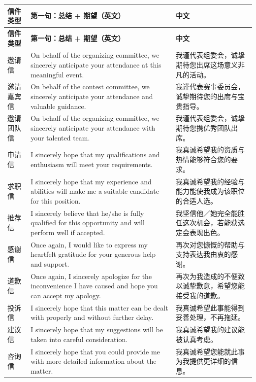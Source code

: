 \documentclass[11pt,a4paper]{ctexart}
\begin{document}
\begin{longtable}{L{2.2cm}L{9.0cm}L{4.7cm}}
\toprule
\textbf{信件类型} & \textbf{第一句：总结 + 期望（英文）} & \textbf{中文} \\
\midrule
\endfirsthead
\toprule
\textbf{信件类型} & \textbf{第一句：总结 + 期望（英文）} & \textbf{中文} \\
\midrule
\endhead
\bottomrule
\endlastfoot

邀请信 & On behalf of the organizing committee, we sincerely anticipate your attendance at this meaningful event. & 我谨代表组委会，诚挚期待您出席这场意义非凡的活动。 \\
邀请嘉宾信 & On behalf of the contest committee, we sincerely anticipate your attendance and valuable guidance. & 我谨代表赛事委员会，诚挚期待您的出席与宝贵指导。 \\
邀请团队信 & On behalf of the organizing committee, we sincerely anticipate your attendance with your talented team. & 我谨代表组委会，诚挚期待您携优秀团队出席。 \\
申请信 & I sincerely hope that my qualifications and enthusiasm will meet your requirements. & 我真诚希望我的资质与热情能够符合您的要求。 \\
求职信 & I sincerely hope that my experience and abilities will make me a suitable candidate for this position. & 我真诚希望我的经验与能力能使我成为该职位的合适人选。 \\
推荐信 & I sincerely believe that he/she is fully qualified for this opportunity and will perform well if accepted. & 我坚信他／她完全能胜任这次机会，若能获选定会表现出色。 \\
感谢信 & Once again, I would like to express my heartfelt gratitude for your generous help and support. & 再次对您慷慨的帮助与支持表达我由衷的感谢。 \\
道歉信 & Once again, I sincerely apologize for the inconvenience I have caused and hope you can accept my apology. & 再次为我造成的不便致以诚挚歉意，希望您能接受我的道歉。 \\
投诉信 & I sincerely hope that this matter can be dealt with properly and without further delay. & 我真诚希望此事能得到妥善处理，不再拖延。 \\
建议信 & I sincerely hope that my suggestions will be taken into careful consideration. & 我真诚希望我的建议能被认真考虑。 \\
咨询信 & I sincerely hope that you could provide me with more detailed information about the matter. & 我真诚希望您能就此事为我提供更详细的信息。 \\

\end{longtable}
\end{document}
